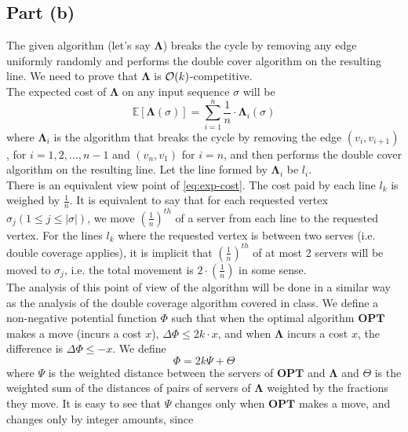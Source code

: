 \documentclass[11pt]{article}
\newcommand{\bigO}{{\cal O}}
\begin{document}
\subsection*{Part (b)}
The given algorithm (let's say $\mathbf{\Lambda}$) breaks the cycle by removing any edge
uniformly randomly and performs the double cover algorithm on the resulting line. We need to prove
that $\mathbf{\Lambda}$ is $\bigO(k)$-competitive. \\
The expected cost of $\mathbf{\Lambda}$ on any input sequence $\sigma$ will be
\begin{equation}
    \label{eq:exp-cost}
    \mathbb{E}[\mathbf{\Lambda}(\sigma)] = \sum_{i=1}^{n} \frac{1}{n} \cdot \mathbf{\Lambda}_{i}(\sigma)
\end{equation}
where $\mathbf{\Lambda}_{i}$ is the algorithm that breaks the cycle by removing the edge $(v_{i}, v_{i+1})$,
for $i = 1, 2, \ldots, n-1$ and $(v_{n}, v_{1})$ for $i =  n$, and then performs the double cover algorithm on the resulting line.
Let the line formed by $\mathbf{\Lambda}_{i}$ be $l_{i}$. \\
There is an equivalent view point of \eqref{eq:exp-cost}. The cost paid by each line $l_{k}$ is weighed by $\frac{1}{n}$.
It is equivalent to say that for each requested vertex $\sigma_{j} (1 \leq j \leq |\sigma|)$, we move $\left(\frac{1}{n}\right)^{th}$ of a server from each line to the requested vertex.
For the lines $l_{k}$ where the requested vertex is between two serves (i.e. double coverage applies), it is
implicit that $\left(\frac{1}{n}\right)^{th}$ of at most 2 servers will be moved to $\sigma_{j}$, i.e.
the total movement is $2 \cdot \left(\frac{1}{n}\right)$ in some sense. \\
The analysis of this point of view of the algorithm will be done in a similar way as the analysis of the
double coverage algorithm covered in class. We define a non-negative potential function $\Phi$ such that
when the optimal algorithm $\mathbf{OPT}$ makes a move (incurs a cost $x$), $\Delta \Phi \leq 2k \cdot x$,
and when $\mathbf{\Lambda}$ incurs a cost $x$, the difference is $\Delta \Phi \leq -x$.
We define
\begin{equation}
    \label{eq:potential}
    \Phi = 2k \Psi + \Theta
\end{equation}
where $\Psi$ is the weighted distance between the servers of $\mathbf{OPT}$ and $\mathbf{\Lambda}$ and $\Theta$ is the
weighted sum of the distances of pairs of servers of $\mathbf{\Lambda}$ weighted by the fractions they move. It is easy to
see that $\Psi$ changes only when $\mathbf{OPT}$ makes a move, and changes only by integer amounts, since
\end{document}
